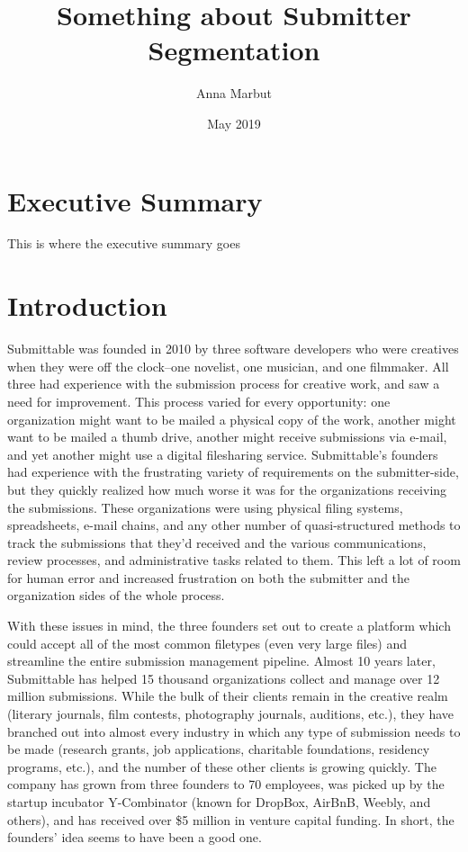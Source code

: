 \documentclass[]{report}   %
\begin{document}
\title{Something about Submitter Segmentation}   %
\author{Anna Marbut}         %
\date{May 2019}    %
\maketitle


\chapter*{Executive Summary}
\label{execsum}
  This is where the executive summary goes



\tableofcontents

\chapter{Introduction}

Submittable was founded in 2010 by three software developers who were creatives when they were off the clock--one novelist, one musician, and one filmmaker. All three had experience with the submission process for creative work, and saw a need for improvement. This process varied for every opportunity: one organization might want to be mailed a physical copy of the work, another might want to be mailed a thumb drive, another might receive submissions via e-mail, and yet another might use a digital filesharing service. Submittable's founders had experience with the frustrating variety of requirements on the submitter-side, but they quickly realized how much worse it was for the organizations receiving the submissions. These organizations were using physical filing systems, spreadsheets, e-mail chains, and any other number of quasi-structured methods to track the submissions that they'd received and the various communications, review processes, and administrative tasks related to them. This left a lot of room for human error and increased frustration on both the submitter and the organization sides of the whole process.

With these issues in mind, the three founders set out to create a platform which could accept all of the most common filetypes (even very large files) and streamline the entire submission management pipeline. Almost 10 years later, Submittable has helped 15 thousand organizations collect and manage over 12 million submissions. While the bulk of their clients remain in the creative realm (literary journals, film contests, photography journals, auditions, etc.), they have branched out into almost every industry in which any type of submission needs to be made (research grants, job applications, charitable foundations, residency programs, etc.), and the number of these other clients is growing quickly. The company has grown from three founders to 70 employees, was picked up by the startup incubator Y-Combinator (known for DropBox, AirBnB, Weebly, and others), and has received over \$5 million in venture capital funding. In short, the founders' idea seems to have been a good one.
\end{document}
